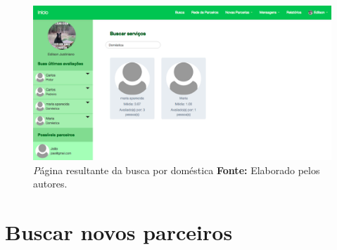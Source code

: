 \begin{figure}[h!]
	\centerline{\includegraphics[scale=0.4]{./imagens/busca-domestica-edilson.png}}
	\caption[\textit Página resultante da busca por doméstica.]
	{\textit Página resultante da busca por doméstica \textbf{Fonte:} Elaborado pelos autores.}
	\label{fig:busca_domestica_edilson}
\end{figure}

\newpage

\section{Buscar novos parceiros}
